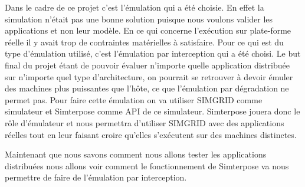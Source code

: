 Dans le cadre de ce projet c'est l'émulation qui a été choisie. En effet la simulation n'était pas une bonne solution puisque nous voulons valider les applications et non leur modèle. En ce qui concerne l'exécution sur plate-forme réelle il y avait trop de contraintes matérielles à satisfaire. Pour ce qui est du type d'émulation utilisé, c'est l'émulation par interception qui a été choisi. Le but final du projet étant de pouvoir évaluer n'importe quelle application distribuée sur n'importe quel type d'architecture, on pourrait se retrouver à devoir émuler des machines plus puissantes que l'hôte, ce que l'émulation par dégradation ne permet pas. Pour faire cette émulation on va utiliser SIMGRID comme simulateur et Simterpose comme API de ce simulateur. Simterpose jouera donc le rôle d'émulateur et nous permettra d'utiliser SIMGRID avec des applications réelles tout en leur faisant croire qu'elles s'exécutent sur des machines distinctes. 

Maintenant que nous savons comment nous allons tester les applications distribuées nous allons voir comment le fonctionnement de Simterpose va nous permettre de faire de l'émulation par interception.
